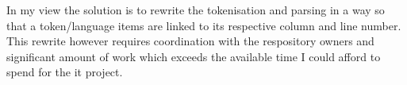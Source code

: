 In my view the solution is to rewrite the tokenisation and parsing in a way so that
a token/language items are linked to its respective column and line number.
This rewrite however requires coordination with the respository owners and significant amount of work
which exceeds the available time I could afford to spend for the it project.


